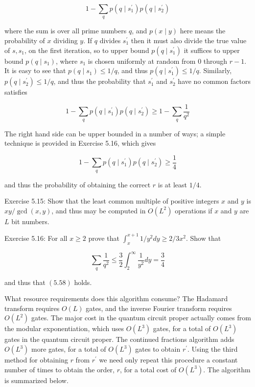\begin{equation}
    1-\sum_{q} p\left(q \mid s_{1}^{\prime}\right) p\left(q \mid s_{2}^{\prime}\right) \tag{5.56}
\end{equation}

where the sum is over all prime numbers $q$, and $p(x \mid y)$ here means the probability of $x$ dividing $y$. If $q$ divides $s_{1}^{\prime}$ then it must also divide the true value of $s, s_{1}$, on the first iteration, so to upper bound $p\left(q \mid s_{1}^{\prime}\right)$ it suffices to upper bound $p\left(q \mid s_{1}\right)$, where $s_{1}$ is chosen uniformly at random from 0 through $r-1$. It is easy to see that $p\left(q \mid s_{1}\right) \leq 1 / q$, and thus $p\left(q \mid s_{1}^{\prime}\right) \leq 1 / q$. Similarly, $p\left(q \mid s_{2}^{\prime}\right) \leq 1 / q$, and thus the probability that $s_{1}^{\prime}$ and $s_{2}^{\prime}$ have no common factors satisfies

\begin{equation}
    1-\sum_{q} p\left(q \mid s_{1}^{\prime}\right) p\left(q \mid s_{2}^{\prime}\right) \geq 1-\sum_{q} \frac{1}{q^{2}} \tag{5.57}
\end{equation}

The right hand side can be upper bounded in a number of ways; a simple technique is provided in Exercise 5.16, which gives

\begin{equation}
    1-\sum_{q} p\left(q \mid s_{1}^{\prime}\right) p\left(q \mid s_{2}^{\prime}\right) \geq \frac{1}{4} \tag{5.58}
\end{equation}

and thus the probability of obtaining the correct $r$ is at least $1 / 4$.

Exercise 5.15: Show that the least common multiple of positive integers $x$ and $y$ is $x y / \operatorname{gcd}(x, y)$, and thus may be computed in $O\left(L^{2}\right)$ operations if $x$ and $y$ are $L$ bit numbers.

Exercise 5.16: For all $x \geq 2$ prove that $\int_{x}^{x+1} 1 / y^{2} d y \geq 2 / 3 x^{2}$. Show that

\begin{equation}
    \sum_{q} \frac{1}{q^{2}} \leq \frac{3}{2} \int_{2}^{\infty} \frac{1}{y^{2}} d y=\frac{3}{4} \tag{5.59}
\end{equation}

and thus that $(5.58)$ holds.

What resource requirements does this algorithm consume? The Hadamard transform requires $O(L)$ gates, and the inverse Fourier transform requires $O\left(L^{2}\right)$ gates. The major cost in the quantum circuit proper actually comes from the modular exponentiation, which uses $O\left(L^{3}\right)$ gates, for a total of $O\left(L^{3}\right)$ gates in the quantum circuit proper. The continued fractions algorithm adds $O\left(L^{3}\right)$ more gates, for a total of $O\left(L^{3}\right)$ gates to obtain $r^{\prime}$. Using the third method for obtaining $r$ from $r^{\prime}$ we need only repeat this procedure a constant number of times to obtain the order, $r$, for a total cost of $O\left(L^{3}\right)$. The algorithm is summarized below.

